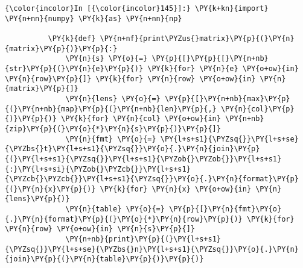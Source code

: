     \begin{Verbatim}[commandchars=\\\{\}]
{\color{incolor}In [{\color{incolor}145}]:} \PY{k+kn}{import} \PY{n+nn}{numpy} \PY{k}{as} \PY{n+nn}{np}
          
          \PY{k}{def} \PY{n+nf}{print\PYZus{}matrix}\PY{p}{(}\PY{n}{matrix}\PY{p}{)}\PY{p}{:}
              \PY{n}{s} \PY{o}{=} \PY{p}{[}\PY{p}{[}\PY{n+nb}{str}\PY{p}{(}\PY{n}{e}\PY{p}{)} \PY{k}{for} \PY{n}{e} \PY{o+ow}{in} \PY{n}{row}\PY{p}{]} \PY{k}{for} \PY{n}{row} \PY{o+ow}{in} \PY{n}{matrix}\PY{p}{]}
              \PY{n}{lens} \PY{o}{=} \PY{p}{[}\PY{n+nb}{max}\PY{p}{(}\PY{n+nb}{map}\PY{p}{(}\PY{n+nb}{len}\PY{p}{,} \PY{n}{col}\PY{p}{)}\PY{p}{)} \PY{k}{for} \PY{n}{col} \PY{o+ow}{in} \PY{n+nb}{zip}\PY{p}{(}\PY{o}{*}\PY{n}{s}\PY{p}{)}\PY{p}{]}
              \PY{n}{fmt} \PY{o}{=} \PY{l+s+s1}{\PYZsq{}}\PY{l+s+se}{\PYZbs{}t}\PY{l+s+s1}{\PYZsq{}}\PY{o}{.}\PY{n}{join}\PY{p}{(}\PY{l+s+s1}{\PYZsq{}}\PY{l+s+s1}{\PYZob{}\PYZob{}}\PY{l+s+s1}{:}\PY{l+s+si}{\PYZob{}\PYZcb{}}\PY{l+s+s1}{\PYZcb{}\PYZcb{}}\PY{l+s+s1}{\PYZsq{}}\PY{o}{.}\PY{n}{format}\PY{p}{(}\PY{n}{x}\PY{p}{)} \PY{k}{for} \PY{n}{x} \PY{o+ow}{in} \PY{n}{lens}\PY{p}{)}
              \PY{n}{table} \PY{o}{=} \PY{p}{[}\PY{n}{fmt}\PY{o}{.}\PY{n}{format}\PY{p}{(}\PY{o}{*}\PY{n}{row}\PY{p}{)} \PY{k}{for} \PY{n}{row} \PY{o+ow}{in} \PY{n}{s}\PY{p}{]}
              \PY{n+nb}{print}\PY{p}{(}\PY{l+s+s1}{\PYZsq{}}\PY{l+s+se}{\PYZbs{}n}\PY{l+s+s1}{\PYZsq{}}\PY{o}{.}\PY{n}{join}\PY{p}{(}\PY{n}{table}\PY{p}{)}\PY{p}{)}
              

\end{Verbatim}
